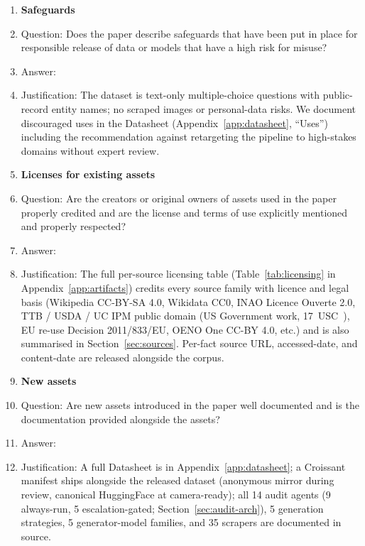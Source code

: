 \begin{enumerate}
\item {\bf Safeguards}
    \item[] Question: Does the paper describe safeguards that have been put in place for responsible release of data or models that have a high risk for misuse?
    \item[] Answer: \answerYes{}
    \item[] Justification: The dataset is text-only multiple-choice questions with public-record entity names; no scraped images or personal-data risks. We document discouraged uses in the Datasheet (Appendix~\ref{app:datasheet}, ``Uses'') including the recommendation against retargeting the pipeline to high-stakes domains without expert review.

\item {\bf Licenses for existing assets}
    \item[] Question: Are the creators or original owners of assets used in the paper properly credited and are the license and terms of use explicitly mentioned and properly respected?
    \item[] Answer: \answerYes{}
    \item[] Justification: The full per-source licensing table (Table~\ref{tab:licensing} in Appendix~\ref{app:artifacts}) credits every source family with licence and legal basis (Wikipedia CC-BY-SA 4.0, Wikidata CC0, INAO Licence Ouverte 2.0, TTB / USDA / UC IPM public domain (US Government work, 17~USC~), EU re-use Decision 2011/833/EU, OENO One CC-BY 4.0, etc.) and is also summarised in Section~\ref{sec:sources}. Per-fact source URL, accessed-date, and content-date are released alongside the corpus.

\item {\bf New assets}
    \item[] Question: Are new assets introduced in the paper well documented and is the documentation provided alongside the assets?
    \item[] Answer: \answerYes{}
    \item[] Justification: A full Datasheet is in Appendix~\ref{app:datasheet}; a Croissant manifest \citep{koehn2024croissant} ships alongside the released dataset (anonymous mirror during review, canonical HuggingFace at camera-ready); all 14 audit agents (9 always-run, 5 escalation-gated; Section~\ref{sec:audit-arch}), 5 generation strategies, 5 generator-model families, and 35 scrapers are documented in source.


\end{enumerate}

